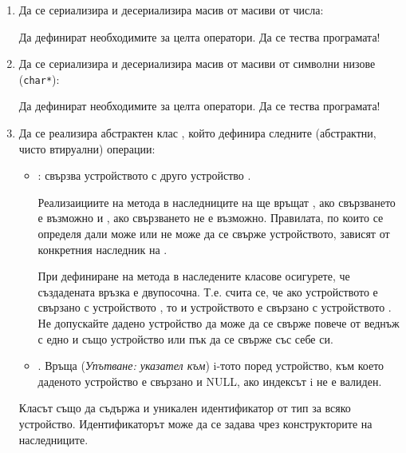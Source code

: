 \begin{enumerate}[resume]

	\item Да се сериализира и десериализира масив от масиви от числа:


	Да дефинират необходимите за целта оператори. Да се тества програмата!

	\item Да се сериализира и десериализира масив от масиви от символни низове (\texttt{char*}):


	Да дефинират необходимите за целта оператори. Да се тества програмата!

	\item Да се реализира абстрактен клас , който дефинира следните (абстрактни, чисто втируални) операции:

	\begin{itemize}
		\item {}: свързва устройството с друго устройство .

		Реализаициите на метода в наследниците на  ще връщат , ако свързването е възможно и , ако свързването не е възможно.  Правилата, по които се определя дали може или не може да се свърже устройството, зависят от конкретния наследник на .

		При дефиниране на метода в наследените класове осигурете, че създадената връзка е двупосочна. Т.е. счита се, че ако устройството  е свързано с устройството , то и устройството  е свързано с устройството . Не допускайте дадено устройство да може да се свърже повече от веднъж с едно и също устройство или пък да се свърже със себе си.

		\item {}. Връща (\textit{Упътване: указател към}) i-тото поред устройство, към което даденото устройство е свързано и NULL, ако индексът i не е валиден.

	\end{itemize}

	Класът  също да съдържа и уникален идентификатор от тип  за всяко устройство. Идентификаторът може да се задава чрез конструкторите на наследниците.


\end{enumerate}
